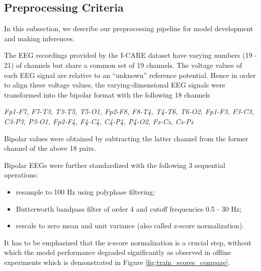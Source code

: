 \subsection{Preprocessing Criteria}
\label{subsec:data_preproc}

In this subsection, we describe our preprocessing pipeline for model development and making inferences.

The EEG recordings provided by the I-CARE dataset have varying numbers (19 - 21) of channels but share a common set of 19 channels. The voltage values of each EEG signal are relative to an ``unknown'' reference potential. Hence in order to align these voltage values, the varying-dimensional EEG signals were transformed into the bipolar format with the following 18 channels
\begin{indentedquote}{0.3in}
\it Fp1-F7, F7-T3, T3-T5, T5-O1, Fp2-F8, F8-T4, T4-T6, T6-O2, Fp1-F3, F3-C3, C3-P3, P3-O1, Fp2-F4, F4-C4, C4-P4, P4-O2, Fz-Cz, Cz-Pz
\end{indentedquote}
Bipolar values were obtained by subtracting the latter channel from the former channel of the above 18 pairs.

Bipolar EEGs were further standardized with the following 3 sequential operations:
\begin{itemize}
    \item resample to 100 Hz using polyphase filtering;
    \item Butterworth bandpass filter of order 4 and cutoff frequencies 0.5 - 30 Hz;
    \item rescale to zero mean and unit variance (also called z-score normalization).
\end{itemize}

It has to be emphasized that the z-score normalization is a crucial step, without which the model performance degraded significantly as observed in offline experiments which is demonstrated in Figure \ref{fig:train_scores_compare}.


